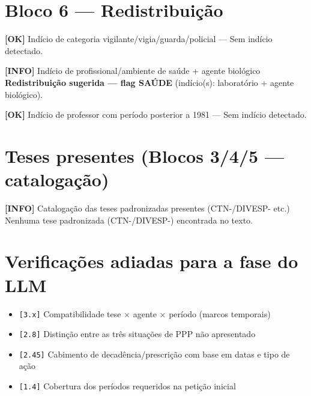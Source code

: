 \documentclass[12pt,a4paper]{article}
\newcommand{\statusOK}[1]{\textcolor{corOK}{\textbf{[OK]}} #1}
\newcommand{\statusINFO}[1]{\textcolor{corINFO}{\textbf{[INFO]}} #1}
\begin{document}
\section{Bloco 6 --- Redistribuição}

\statusOK{Indício de categoria vigilante/vigia/guarda/policial} --- Sem indício detectado.

\medskip
\statusINFO{Indício de profissional/ambiente de saúde + agente biológico}\\
\textcolor{corVERIFICAR}{\textbf{Redistribuição sugerida --- flag SAÚDE}} (indício(s): laboratório + agente biológico).

\medskip
\statusOK{Indício de professor com período posterior a 1981} --- Sem indício detectado.

\section{Teses presentes (Blocos 3/4/5 --- catalogação)}

\statusINFO{Catalogação das teses padronizadas presentes (CTN-/DIVESP- etc.)}\\
Nenhuma tese padronizada (CTN-/DIVESP-) encontrada no texto.

\section{Verificações adiadas para a fase do LLM}

\begin{itemize}
  \item \texttt{[3.x]} Compatibilidade tese × agente × período (marcos temporais)
  \item \texttt{[2.8]} Distinção entre as três situações de PPP não apresentado
  \item \texttt{[2.45]} Cabimento de decadência/prescrição com base em datas e tipo de ação
  \item \texttt{[1.4]} Cobertura dos períodos requeridos na petição inicial
\end{itemize}
\end{document}
